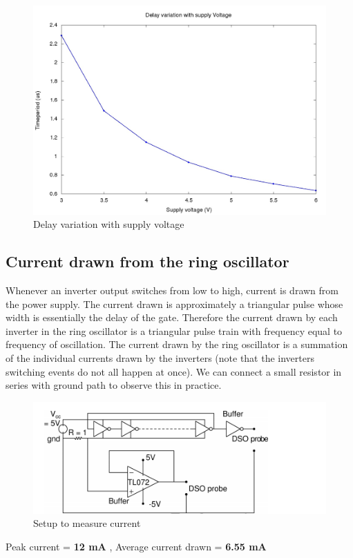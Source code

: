 \documentclass[12pt]{article}
\begin{document}
\begin{figure}[!t]
    \centering
    \includegraphics[scale=0.4]{figs/Supply_load_var.jpg}
    \caption{Delay variation with supply voltage}
    \label{fig:my_label}
\end{figure}
\vspace{15mm}
\subsection{Current drawn from the ring oscillator}
Whenever an inverter output switches from low to high, current is drawn
from the power supply. The current drawn is approximately a triangular
pulse whose width is essentially the delay of the gate. Therefore the current
drawn by each inverter in the ring oscillator is a triangular pulse train with
frequency equal to frequency of oscillation. The current drawn by the ring
oscillator is a summation of the individual currents drawn by the inverters
(note that the inverters switching events do not all happen at once). We
can connect a small resistor in series with ground path to observe this in
practice.
\begin{figure}
    \centering
    \includegraphics{figs/current.png}
    \caption{Setup to measure current}
    \label{fig:my_label}
\end{figure}

Peak current = \textbf{12 mA} , Average current drawn = \textbf{6.55 mA}

 
\end{document}
